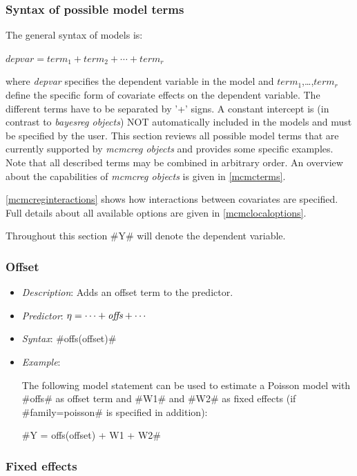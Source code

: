 \subsubsection{Syntax of possible model terms}
\label{mcmcregmodelsyntax}

The general syntax of models is:

$depvar = term_1 + term_2 + \cdots + term_r$

where {\em depvar} specifies the dependent variable in the model
and $term_1$,\dots,$term_r$ define the specific form of covariate
effects on the dependent variable. The different terms have to be
separated by '+' signs. A constant intercept is (in contrast to
{\em bayesreg objects}) NOT automatically
included in the models and must be specified by the
user. This section reviews all possible model terms that are
currently supported by {\em mcmcreg objects} and provides some
specific examples. Note that all described terms may be combined
in arbitrary order. An overview about the capabilities of {\em
mcmcreg objects} is given in \autoref{mcmcterms}.

\autoref{mcmcreginteractions} shows how interactions between
covariates are specified. Full details about all available options
are given in \autoref{mcmclocaloptions}.

Throughout this section #Y# will denote the dependent variable.

\subsubsection*{Offset}

\begin{itemize}
\item[] {\em Description}: Adds an offset term to the predictor.
\item[] {\em Predictor}: $\eta =  \cdots + \mbox{\it offs} + \cdots$
\item[] {\em Syntax}: #offs(offset)#
\item[] {\em Example}:

The following model statement can be used to estimate a Poisson
model with #offs# as offset term and #W1# and #W2# as fixed
effects (if #family=poisson# is specified in addition):

#Y = offs(offset) + W1 + W2#

\end{itemize}

\subsubsection*{Fixed effects}

